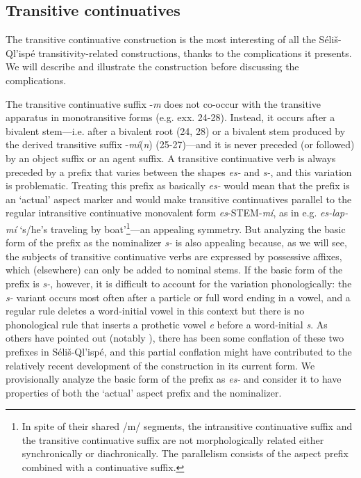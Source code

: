 \documentclass[output=paper,colorlinks,citecolor=brown]{langscibook}
\begin{document}
\subsection{Transitive continuatives}  %

The transitive continuative construction is the most interesting of
all the S\'eli\v{s}-Ql'isp\'e transitivity-related constructions,
thanks to the complications it presents.  We will describe and
illustrate the construction before discussing the complications.

The transitive continuative suffix -\emph{m} does not co-occur with
the transitive apparatus in monotransitive forms (e.g.  exx. 24-28).
Instead, it occurs after a bivalent stem---i.e. after a bivalent root
(24, 28) or a bivalent stem produced by the derived transitive suffix
-\emph{m\'i}(\emph{n}) (25-27)---and it is never preceded (or
followed) by an object suffix or an agent suffix.  A transitive
continuative verb is always preceded by a prefix that varies between
the shapes \emph{es-} and \emph{s-}, and this variation is
problematic.  Treating this prefix as basically \emph{es-} would mean
that the prefix is an `actual' aspect marker and would make transitive
continuatives parallel to the regular intransitive continuative
monovalent form \emph{es}-STEM-\emph{m\'i}, as in
e.g. \emph{es-lap-m\'i} `s/he's traveling by boat'\footnote{In spite
of their shared /m/ segments, the intransitive continuative suffix and
the transitive continuative suffix are not morphologically related
either synchronically or diachronically. The parallelism consists of
the aspect prefix combined with a continuative suffix.  }---an
appealing symmetry.  But analyzing the basic form of the prefix as the
nominalizer \emph{s-} is also appealing because, as we will see, the
subjects of transitive continuative verbs are expressed by possessive
affixes, which (elsewhere) can only be added to nominal stems.  If the
basic form of the prefix is \emph{s-}, however, it is difficult to
account for the variation phonologically: the \emph{s-} variant occurs
most often after a particle or full word ending in a vowel, and a
regular rule deletes a word-initial vowel in this context but there
is no phonological rule that inserts a prothetic vowel \emph{e} before
a word-initial \emph{s}.  As others have pointed out (notably
\cite{Kroeber:1999}), there has been some conflation of these two
prefixes in S\'eli\v{s}-Ql'isp\'e, and this partial conflation might
have contributed to the relatively recent development of the
construction in its current form.  We provisionally analyze the basic
form of the prefix as \emph{es-} and consider it to have properties of
both the `actual' aspect prefix and the nominalizer.
\end{document}
